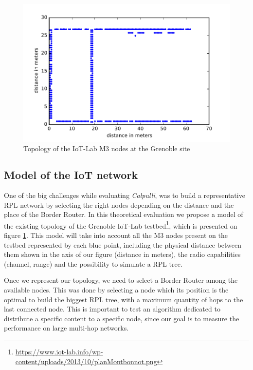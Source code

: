\begin{figure}[htb]
	\centering
	\includegraphics[width=0.8 \columnwidth]{chapters/inter-node.images/grenoble-topology-m3.pdf}
	\caption{Topology of the IoT-Lab M3 nodes at the Grenoble site} \label{fig:GrenobleTopology}
\end{figure}

\subsection{Model of the IoT network}
One of the big challenges while evaluating \textit{Calpulli}, was to build a representative RPL network by selecting the right nodes depending on the distance and the place of the Border Router.
In this theoretical evaluation we propose a model of the existing topology of the Grenoble IoT-Lab testbed\footnote{\url{https://www.iot-lab.info/wp-content/uploads/2013/10/planMontbonnot.png}}, which is presented on figure \ref{fig:GrenobleTopology}.
This model will take into account all the M3 nodes present on the testbed represented by each blue point, including the physical distance between them shown in the axis of our figure (distance in meters), the radio capabilities (channel, range) and the possibility to simulate a RPL tree.

Once we represent our topology, we need to select a Border Router among the available nodes.
This was done by selecting a node which its position is the optimal to build the biggest RPL tree, with a maximum quantity of hops to the last connected node.
This is important to test an algorithm dedicated to distribute a specific content to a specific node, since our goal is to measure the performance on large multi-hop networks.

